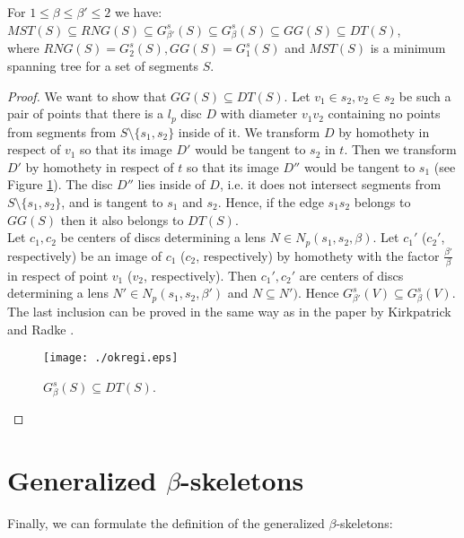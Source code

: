\documentclass[11pt]{llncs}
\begin{document}
\begin{lemma}
\label{gg-dt-s}
For $1 \leq \beta \leq \beta' \leq 2$ we have: \\ 
$MST(S) \subseteq RNG(S) \subseteq G_{\beta'}^s{(S)} \subseteq G_{\beta}^s{(S)} \subseteq GG(S) \subseteq DT(S)$,\\
where $RNG(S)=G_{2}^s{(S)}, GG(S)=G_1^s{(S)}$ and $MST(S)$ is a minimum spanning tree for a set 
of segments $S$.
\end{lemma}
\begin{proof} 
We want to show that $GG(S) \subseteq DT(S)$.
Let $v_1 \in s_2, v_2 \in s_2$ be such a pair of points that there is a $l_p$ disc $D$ 
with diameter $v_1v_2$ containing no points from segments from $S \setminus \{s_1, s_2\}$ inside of it. 
We transform $D$ by homothety in respect of $v_1$ so that its image $D'$ would be tangent to $s_2$ 
in $t$. Then we transform $D'$ by homothety in respect of $t$ so that its image $D''$ would be 
tangent to $s_1$ (see Figure \ref{fig:gg-dt}). The disc $D''$ lies inside of $D$, i.e. it does not 
intersect segments from $S \setminus \{s_1, s_2\}$, and is tangent to $s_1$ and $s_2$. Hence, 
if the edge $s_1s_2$ belongs to $GG(S)$ then it also belongs to $DT(S)$. \\
Let $c_1, c_2$ be centers of discs determining a lens $N \in N_p(s_1,s_2,\beta)$.
Let $c_1'$ ($c_2'$, respectively) be an image of $c_1$ ($c_2$, respectively)
by homothety with the factor $\frac{\beta'}{\beta}$ in respect of point $v_1$ ($v_2$, respectively).
Then $c_1', c_2'$ are centers of discs determining a lens $N' \in N_p(s_1,s_2,\beta')$
and $N \subseteq N')$. Hence $G_{\beta'}^s(V) \subseteq G_{\beta}^s(V)$. \\
The last inclusion can be proved in the same way as in the paper by Kirkpatrick and Radke 
\cite{kr85}.   

\begin{figure}[htbp]
\centering
\texttt{[image: ./okregi.eps]}
\caption{$G_{\beta}^s(S) \subseteq DT(S)$.}
\label{fig:gg-dt}
\end{figure}  
\end{proof}


\section{Generalized $\beta$-skeletons}

Finally, we can formulate the definition of the generalized $\beta$-skeletons:
\end{document}
